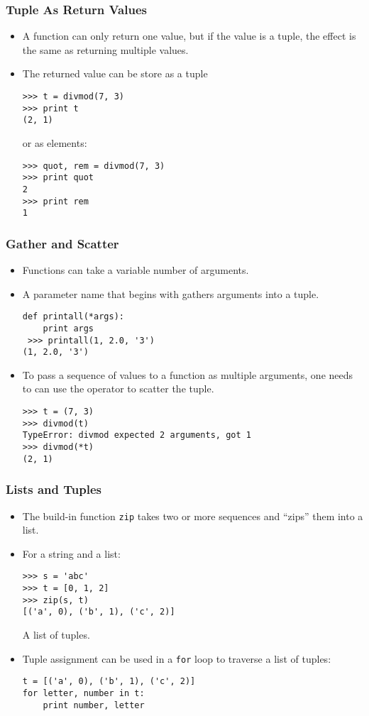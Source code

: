 \documentclass{beamer}
\newcommand{\beforeverb}{\footnotesize}
\newcommand{\afterverb}{\normalsize}
\begin{document}
\begin{frame}[fragile]
\frametitle{Tuple As Return Values}
\begin{itemize}
\item A function can only return one value, but
if the value is a tuple, the effect is the same as returning
\alert{multiple values}. 
\item The returned value can be store as a tuple\beforeverb
\begin{verbatim}
>>> t = divmod(7, 3)
>>> print t
(2, 1)
\end{verbatim}
\afterverb
or as  elements:
\beforeverb
\begin{verbatim}
>>> quot, rem = divmod(7, 3)
>>> print quot
2
>>> print rem
1
\end{verbatim}
\afterverb


\end{itemize}
\end{frame}
\begin{frame}[fragile]
\frametitle{Gather and Scatter}
\begin{itemize}
\item Functions can take a variable number of arguments.  
\item A parameter name that begins with {\tt *} \alert{gathers} arguments into
a tuple. 
\beforeverb
\begin{verbatim}
def printall(*args):
    print args
 >>> printall(1, 2.0, '3')
(1, 2.0, '3')
\end{verbatim}
\afterverb

\item To pass a
sequence of values  to a function
as multiple arguments, one needs to can use the {\tt *} operator to \alert{scatter} the tuple.
\beforeverb
\begin{verbatim}
>>> t = (7, 3)
>>> divmod(t)
TypeError: divmod expected 2 arguments, got 1
>>> divmod(*t)
(2, 1)
\end{verbatim}
\afterverb
\end{itemize}
\end{frame}
\begin{frame}[fragile]
\frametitle{Lists and Tuples}
\begin{itemize}
\item The build-in function {\tt zip} takes two or more \alert{sequences} and
``zips'' them into a \alert{list}.
\item For a string and a list: 
\beforeverb
\begin{verbatim}
>>> s = 'abc'
>>> t = [0, 1, 2]
>>> zip(s, t)
[('a', 0), ('b', 1), ('c', 2)]
\end{verbatim}
\afterverb
A list of tuples. 
%
\item Tuple assignment can be used in a {\tt for} loop to traverse a list of
tuples:
\beforeverb
\begin{verbatim}
t = [('a', 0), ('b', 1), ('c', 2)]
for letter, number in t:
    print number, letter
\end{verbatim}
\afterverb
\end{itemize}


\end{frame}
\end{document}
